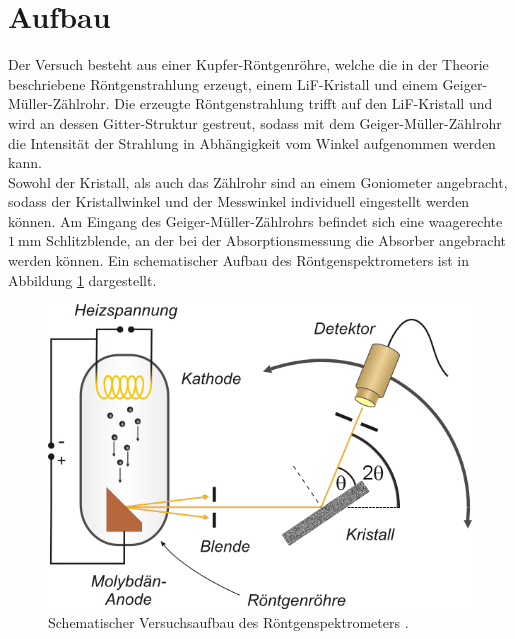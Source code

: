 \section{Aufbau}
\label{sec:Aufbau}

Der Versuch besteht aus einer Kupfer-Röntgenröhre, welche die in der Theorie beschriebene Röntgenstrahlung erzeugt, einem LiF-Kristall und einem Geiger-Müller-Zählrohr. Die erzeugte Röntgenstrahlung trifft auf den LiF-Kristall und wird an dessen Gitter-Struktur gestreut, sodass mit dem Geiger-Müller-Zählrohr die Intensität der Strahlung in Abhängigkeit vom Winkel aufgenommen werden kann.\\
Sowohl der Kristall, als auch das Zählrohr sind an einem Goniometer angebracht, sodass der Kristallwinkel und der Messwinkel individuell eingestellt werden können. Am Eingang des Geiger-Müller-Zählrohrs befindet sich eine waagerechte $\SI{1}{\milli\metre}$ Schlitzblende, an der bei der Absorptionsmessung die Absorber angebracht werden können.
Ein schematischer Aufbau des Röntgenspektrometers ist in Abbildung \ref{fig:Aufbau} dargestellt.

\begin{figure}
\centering
\includegraphics[width=\linewidth-90pt,height=\textheight-90pt,keepaspectratio]{content/images/Aufbau.png}
\caption{Schematischer Versuchsaufbau des Röntgenspektrometers \cite{V602_Aufbau}.}
\label{fig:Aufbau}
\end{figure}
